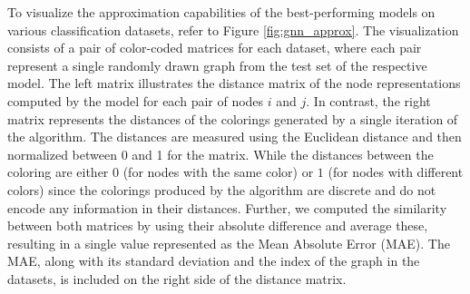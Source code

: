 To visualize the approximation capabilities of the best-performing \gnn models on various classification datasets, refer to Figure \ref{fig:gnn_approx}. The visualization consists of a pair of color-coded matrices for each dataset, where each pair represent a single randomly drawn graph from the test set of the respective \gnn model. The left matrix illustrates the distance matrix of the node representations computed by the \gnn model for each pair of nodes $i$ and $j$. In contrast, the right matrix represents the distances of the colorings generated by a single iteration of the \wl algorithm. The distances are measured using the Euclidean distance and then normalized between 0 and 1 for the \gnn matrix. While the distances between the \wl coloring are either $0$ (for nodes with the same color) or $1$ (for nodes with different colors) since the colorings produced by the \wl algorithm are discrete and do not encode any information in their distances. Further, we computed the similarity between both matrices by using their absolute difference and average these, resulting in a single value represented as the Mean Absolute Error (MAE). The MAE, along with its standard deviation and the index of the graph in the datasets, is included on the right side of the \wl distance matrix.

